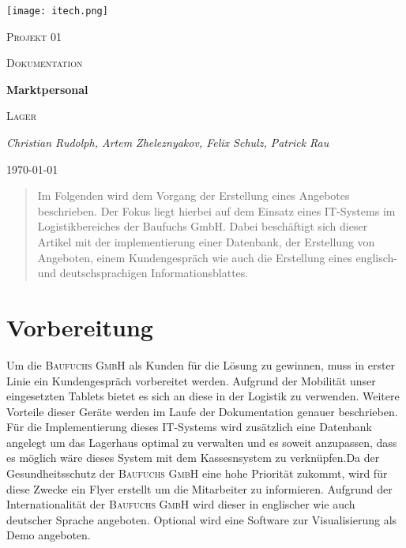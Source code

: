 \documentclass{article}
\begin{document}
\begin{titlepage}
	\centering
	\texttt{[image: itech.png]}\par\vspace{1cm}
	{\scshape\LARGE Projekt 01 \par}
	\vspace{1cm}
	{\scshape\small Dokumentation\par}
	\vspace{1.5cm}
	{\huge\bfseries Marktpersonal \par}
    \vspace{0.5cm}
    {\scshape\small Lager \par}
	
	\vspace{2cm}
	{\Large\itshape Christian Rudolph, Artem Zheleznyakov, Felix Schulz, Patrick Rau\par}
	\vfill
	{\large \today\par}
\end{titlepage}
\tableofcontents
\newpage
\begin{abstract}
Im Folgenden wird dem Vorgang der Erstellung eines Angebotes beschrieben. Der Fokus liegt hierbei auf dem Einsatz eines IT-Systems im Logistikbereiches der Baufuchs GmbH. Dabei beschäftigt sich dieser Artikel mit der implementierung einer Datenbank, der Erstellung von Angeboten, einem Kundengespräch wie auch die Erstellung eines englisch- und deutschsprachigen Informationsblattes.
\end{abstract}


\section{Vorbereitung}
Um die \textsc{Baufuchs GmbH} als Kunden für die Lösung zu gewinnen, muss in erster Linie ein Kundengespräch vorbereitet werden. Aufgrund der Mobilität unser eingesetzten Tablets bietet es sich an diese in der Logistik zu verwenden. Weitere Vorteile dieser Geräte werden im Laufe der Dokumentation genauer beschrieben. \newline
Für die Implementierung dieses IT-Systems wird zusätzlich eine Datenbank angelegt um das Lagerhaus optimal zu verwalten und es soweit anzupassen, dass es möglich wäre dieses System mit dem Kassesnsystem zu verknüpfen.\newline\newline Da der Gesundheitsschutz der \textsc{Baufuchs GmbH} eine hohe Priorität zukommt, wird für diese Zwecke ein Flyer erstellt um die Mitarbeiter zu informieren. Aufgrund der Internationalität der \textsc{Baufuchs GmbH} wird dieser in englischer wie auch deutscher Sprache angeboten.\newline
Optional wird eine Software zur Visualisierung als Demo angeboten.
\end{document}
